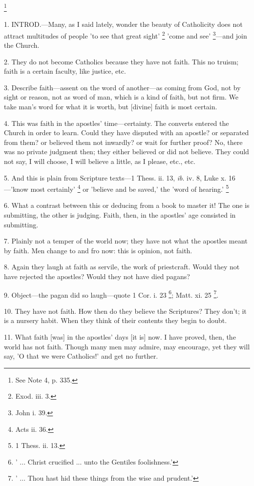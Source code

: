 
\footnote{See Note
4, p. 335.}

1. INTROD.—Many,
as I said lately, wonder the beauty of Catholicity does not attract
multitudes of people 'to see that great sight' \footnote{Exod. iii. 3.} 'come and see' \footnote{John i. 39.}—and
join the Church.

2. They do not become Catholics because they have
not faith. This no truism; faith is a certain faculty, like justice,
etc.

3. Describe faith—assent on the word of
another—as coming from God, not by sight or reason, not as word of
man, which is a kind of faith, but not firm. We take man's word for
what it is worth, but [divine] faith is most certain.

4. This was faith in the apostles'
time—certainty. The converts entered the Church in order to
learn. Could they have disputed with an apostle? or separated from
them? or believed them not inwardly? or wait for further proof? No,
there was no private judgment then; they either believed or did not
believe. They could not say, I will choose, I will believe a little,
as I please, etc., etc.

5. And this is plain from Scripture texts—1
Thess. ii. 13, \emph{ib}. iv. 8, Luke x. 16—'know most certainly' \footnote{Acts ii. 36.} or 'believe and be saved,' the 'word of hearing.' \footnote{1 Thess. ii. 13.}

6. What a contrast between this or deducing from
a book to master it! The one is submitting, the other is judging.
Faith, then, in the apostles' age consisted in submitting.

7. Plainly not a temper of the world now; they
have not what the apostles meant by faith. Men change to and fro now:
this is opinion, not faith.

8. Again they laugh at faith as servile, the work
of priestcraft. Would they not have rejected the apostles? Would they
not have died pagans?

9. Object—the pagan did so laugh—quote 1 Cor.
i. 23 \footnote{' ... Christ crucified
... unto the Gentiles foolishness.'}; Matt. xi. 25 \footnote{' ... Thou hast hid
these things from the wise and prudent.'}.

10. They have not faith. How then do they believe
the Scriptures? They don't; it is a nursery habit. When they think of
their contents they begin to doubt.

11. What faith [was] in the apostles' days [it
is] now. I have proved, then, the world has not faith. Though many men
may admire, may encourage, yet they will say, 'O that we were
Catholics!' and get no further.


